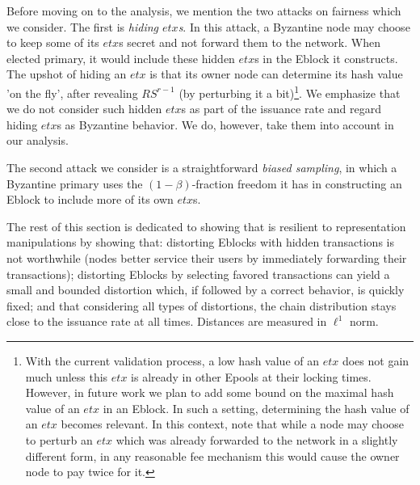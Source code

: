 
Before moving on to the analysis, we mention the two attacks on fairness which we consider. The first is \textit{hiding $etx$s}. In this attack, a Byzantine node may choose to keep some of its $etx$s secret and not forward them to the network. When elected primary, it would include these hidden $etx$s in the Eblock it constructs. The upshot of hiding an $etx$ is that its owner node can determine its hash value 'on the fly', after revealing $RS^{r-1}$ (by perturbing it a bit)\footnote{With the current validation process, a low hash value of an $etx$ does not gain much unless this $etx$ is already in other Epools at their locking times. However, in future work we plan to add some bound on the maximal hash value of an $etx$ in an Eblock. In such a setting, determining the hash value of an $etx$ becomes relevant. In this context, note that while a node may choose to perturb an $etx$ which was already forwarded to the network in a slightly different form, in any reasonable fee mechanism this would cause the owner node to pay twice for it.}. We emphasize that we do not consider such hidden $etx$s as part of the issuance rate and regard hiding $etx$s as Byzantine behavior. We do, however, take them into account in our analysis.

The second attack we consider is a straightforward \textit{biased sampling}, in which a Byzantine primary uses the $(1-\beta)$-fraction freedom it has in constructing an Eblock to include more of its own $etx$s. 

The rest of this section is dedicated to showing that \name is resilient to representation manipulations by showing that: distorting Eblocks with hidden transactions is not worthwhile (nodes better service their users by immediately forwarding their transactions); distorting Eblocks by selecting favored transactions can yield a small and bounded distortion which, if followed by a correct behavior, is quickly fixed;  and that considering all types of distortions, the chain distribution stays close to the issuance rate at all times. Distances are measured in $\ell^1$ norm. %

